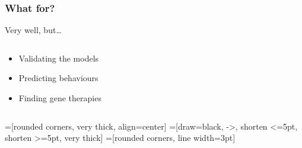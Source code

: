 
\begin{frame}
  \frametitle{What for?}

\begin{center}
\LARGE
  Very well, but…

\Huge
  \vspace*{1em}
  \pause
  \vspace*{.2em}
\end{center}

\pause
\begin{columns}
\begin{column}{.5\textwidth}

\begin{itemize}
  \item Validating the models
  \item Predicting behaviours
  \item Finding gene therapies
\end{itemize}

\end{column}
\end{columns}

\end{frame}



=[rounded corners, very thick, align=center]
=[draw=black, ->, shorten <=5pt, shorten >=5pt, very thick]
=[rounded corners, line width=3pt]

